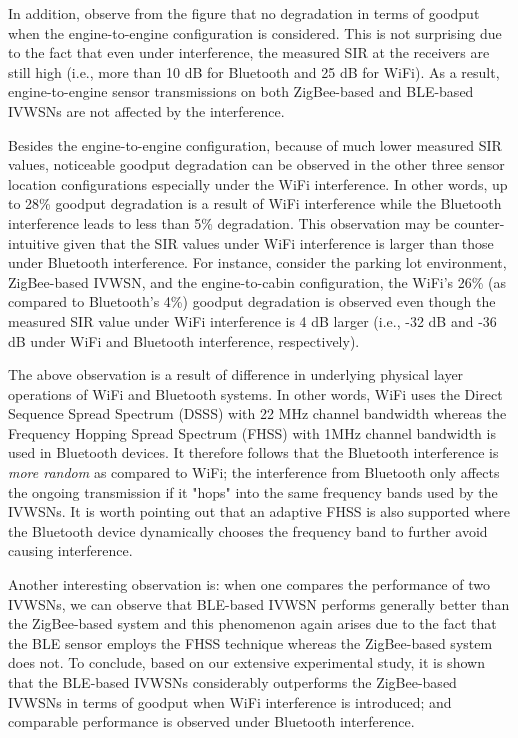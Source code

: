 \documentclass[journal]{IEEEtran}
\begin{document}
In addition, observe from the figure that no degradation in terms of goodput when the engine-to-engine configuration is considered. This is not surprising due to the fact that even under interference, the measured SIR at the receivers are still high (i.e., more than 10 dB for Bluetooth and 25 dB for WiFi). As a result, engine-to-engine sensor transmissions on both ZigBee-based and BLE-based IVWSNs are not affected by the interference. 

Besides the engine-to-engine configuration, because of much lower measured SIR values, noticeable goodput degradation can be observed in the other three sensor location configurations especially under the WiFi interference. In other words, up to 28\% goodput degradation is a result of WiFi interference while the Bluetooth interference leads to less than 5\% degradation. This observation may be counter-intuitive given that the SIR values under WiFi interference is larger than those under Bluetooth interference. For instance, consider the parking lot environment, ZigBee-based IVWSN, and the engine-to-cabin configuration, the WiFi's 26\% (as compared to Bluetooth's 4\%) goodput degradation is observed even though the measured SIR value under WiFi interference is 4 dB larger (i.e., -32 dB and -36 dB under WiFi and Bluetooth interference, respectively).

The above observation is a result of difference in underlying physical layer operations of WiFi and Bluetooth systems. In other words, WiFi uses the Direct Sequence Spread Spectrum (DSSS) with 22 MHz channel bandwidth whereas the Frequency Hopping Spread Spectrum (FHSS) with 1MHz channel bandwidth is used in Bluetooth devices. It therefore follows that the Bluetooth interference is \textit{more random} as compared to WiFi; the interference from Bluetooth only affects the ongoing transmission if it "hops" into the same frequency bands used by the IVWSNs.  It is worth pointing out that an adaptive FHSS is also supported where the Bluetooth device dynamically chooses the frequency band to further avoid causing interference. 

Another interesting observation is: when one compares the performance of two IVWSNs, we can observe that BLE-based IVWSN performs generally better than the ZigBee-based system and this phenomenon again arises due to the fact that the BLE sensor employs the FHSS technique whereas the ZigBee-based system does not. To conclude, based on our extensive experimental study, it is shown that the BLE-based IVWSNs considerably outperforms the ZigBee-based IVWSNs in terms of goodput when WiFi interference is introduced; and comparable performance is observed under Bluetooth interference.
\end{document}

